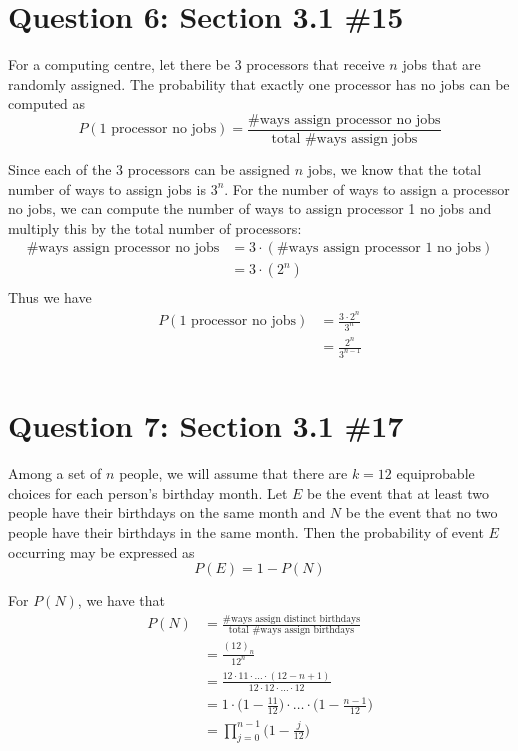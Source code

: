 \documentclass[11pt, oneside]{article}   	%
\begin{document}
\section*{Question 6: Section 3.1 \#15}

For a computing centre, let there be 3 processors that receive $n$ jobs that are randomly assigned. The probability that exactly one processor has no jobs can be computed as
$$P(\text{1 processor no jobs}) = \frac{\text{\# ways assign processor no jobs}}{\text{total \# ways assign jobs}}$$

Since each of the 3 processors can be assigned $n$ jobs, we know that the total number of ways to assign jobs is $3^n$. For the number of ways to assign a processor no jobs, we can compute the number of ways to assign processor 1 no jobs and multiply this by the total number of processors:
\begin{align*}
	\text{\# ways assign processor no jobs} & = 3 \cdot (\text{\# ways assign processor 1 no jobs}) \\
	& = 3 \cdot (2^n) \\
\end{align*}
Thus we have
\begin{align*}
	P(\text{1 processor no jobs}) & = \frac{3 \cdot 2^n}{3^n} \\
	& = \frac{2^n}{3^{n-1}} \\
\end{align*}


\section*{Question 7: Section 3.1 \#17}

Among a set of $n$ people, we will assume that there are $k=12$ equiprobable choices for each person's birthday month. Let $E$ be the event that at least two people have their birthdays on the same month and $N$ be the event that no two people have their birthdays in the same month. Then the probability of event $E$ occurring may be expressed as
$$P(E) = 1 - P(N)$$

For $P(N)$, we have that
\begin{align*}
	P(N) & = \frac{\text{\# ways assign distinct birthdays}}{\text{total \# ways assign birthdays}} \\
	& = \frac{(12)_n}{12^n} \\
	& = \frac{12 \cdot 11 \cdot \ldots \cdot (12-n+1)}{12 \cdot 12 \cdot \ldots \cdot 12} \\
	& = 1 \cdot \Big(1 -\frac{11}{12}\Big) \cdot \ldots \cdot \Big(1- \frac{n-1}{12}\Big) \\
	& = \prod_{j=0}^{n-1} \Big(1- \frac{j}{12} \Big) \\
\end{align*}
\end{document}
